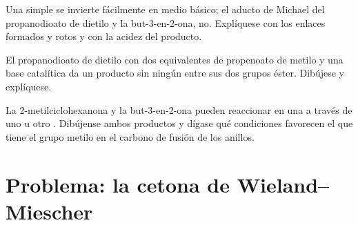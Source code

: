 \begin{exercise}[$\star\star\star$]\label{exo:b2:conjugate-additions:10}
Una  simple se invierte fácilmente en medio básico; el aducto de Michael del propanodioato de dietilo y la
but-3-en-2-ona, no. Explíquese con los enlaces formados y rotos y con la acidez del producto.
\end{exercise}

\begin{exercise}[$\star\star\star$]\label{exo:b2:conjugate-additions:11}
El propanodioato de dietilo con dos equivalentes de propenoato de metilo y una base catalítica da un producto
sin ningún  entre sus dos grupos éster. Dibújese y explíquese.
\end{exercise}

\begin{exercise}[$\star\star\star$]\label{exo:b2:conjugate-additions:12}
La 2-metilciclohexanona y la but-3-en-2-ona pueden reaccionar en una  a través de uno u otro .
Dibújense ambos productos y dígase qué condiciones favorecen el que tiene el grupo metilo en el carbono
de fusión de los anillos.
\end{exercise}

\section{Problema: la cetona de Wieland--Miescher}

